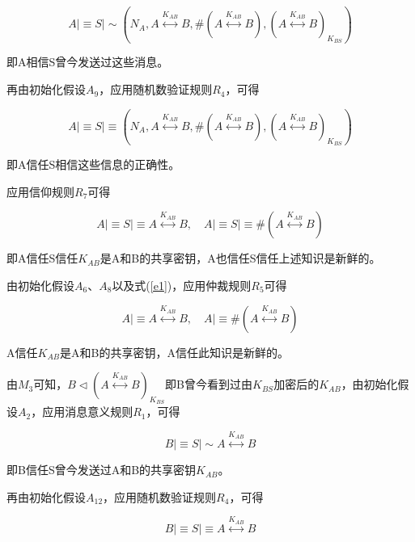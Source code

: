 \documentclass[cs4size,a4pape,UTF8]{ctexart}
\numberwithin{equation}{section}
\numberwithin{table}{section}
\numberwithin{figure}{section}
\begin{document}
\begin{equation}
A{\lvert\equiv}S{\lvert\sim}(N_{A},A\stackrel{K_{AB}}{\longleftrightarrow}B,\#(A\stackrel{K_{AB}}{\longleftrightarrow}B),{(A\stackrel{K_{AB}}{\longleftrightarrow}B)}_{K_{BS}})
\end{equation}

即A相信S曾今发送过这些消息。

再由初始化假设$A_{9}$，应用随机数验证规则$R_{4}$，可得

\begin{equation}
A{\lvert\equiv}S{\lvert\equiv}(N_{A},A\stackrel{K_{AB}}{\longleftrightarrow}B,\#(A\stackrel{K_{AB}}{\longleftrightarrow}B),{(A\stackrel{K_{AB}}{\longleftrightarrow}B)}_{K_{BS}})
\end{equation}

即A信任S相信这些信息的正确性。

应用信仰规则$R_{7}$可得

\begin{equation}
A{\lvert\equiv}S{\lvert\equiv}A\stackrel{K_{AB}}{\longleftrightarrow}B,{\quad}A{\lvert\equiv}S{\lvert\equiv}\#(A\stackrel{K_{AB}}{\longleftrightarrow}B)\label{e1}
\end{equation}

即A信任S信任$K_{AB}$是A和B的共享密钥，A也信任S信任上述知识是新鲜的。

由初始化假设$A_{6}$、$A_{8}$以及式(\ref{e1})，应用仲裁规则$R_{5}$可得

\begin{equation}
A{\lvert\equiv}A\stackrel{K_{AB}}{\longleftrightarrow}B,{\quad}A{\lvert\equiv}\#(A\stackrel{K_{AB}}{\longleftrightarrow}B)\label{e2}
\end{equation}

A信任$K_{AB}$是A和B的共享密钥，A信任此知识是新鲜的。

由$M_{3}$可知，$B\triangleleft{(A\stackrel{K_{AB}}{\longleftrightarrow}B)}_{K_{BS}}$即B曾今看到过由$K_{BS}$加密后的$K_{AB}$，由初始化假设$A_{2}$，应用消息意义规则$R_{1}$，可得

\begin{equation}
B{\lvert\equiv}S{\lvert\sim}A\stackrel{K_{AB}}{\longleftrightarrow}B
\end{equation}

即B信任S曾今发送过A和B的共享密钥$K_{AB}$。

再由初始化假设$A_{12}$，应用随机数验证规则$R_{4}$，可得

\begin{equation}
B{\lvert\equiv}S{\lvert\equiv}A\stackrel{K_{AB}}{\longleftrightarrow}B
\end{equation}
\end{document}
